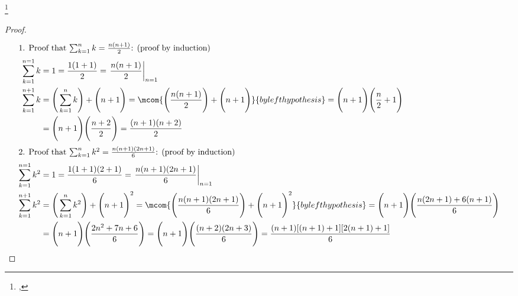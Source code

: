 \begin{proposition}
\footnote{
  ,
  }
\label{prop:powersums}
\end{proposition}
\begin{proof}
\begin{align*}
\intertext{1. Proof that $\sum_{k=1}^n k=\frac{n(n+1)}{2}$: (proof by induction)}
  \sum_{k=1}^{n=1} k
    &= 1
     = \frac{1(1+1)}{2}
     = \left.\frac{n(n+1)}{2}\right|_{n=1}
  \\
  \sum_{k=1}^{n+1} k
    &= \Bigg(\sum_{k=1}^n k\Bigg) + \Bigg(n+1\Bigg)
     = \mcom{\Bigg(\frac{n(n+1)}{2}\Bigg) + \Bigg(n+1\Bigg)}
       {by left hypothesis}
     = \Bigg(n+1\Bigg)\Bigg(\frac{n}{2}+1\Bigg)
  \\&= \Bigg(n+1\Bigg)\Bigg(\frac{n+2}{2}\Bigg)
     = \frac{(n+1)(n+2)}{2}
  \\
\intertext{2. Proof that $\sum_{k=1}^n k^2 = \frac{n(n+1)(2n+1)}{6}$: (proof by induction)}
  \sum_{k=1}^{n=1} k^2
    &= 1
     = \frac{1(1+1)(2+1)}{6}
     = \left.\frac{n(n+1)(2n+1)}{6}\right|_{n=1}
  \\
  \sum_{k=1}^{n+1} k^2
    &= \Bigg(\sum_{k=1}^n k^2\Bigg) + \Bigg(n+1\Bigg)^2
     = \mcom{\Bigg(\frac{n(n+1)(2n+1)}{6}\Bigg) + \Bigg(n+1\Bigg)^2}
            {by left hypothesis}
     = \Bigg(n+1\Bigg)\Bigg(\frac{n(2n+1)+6(n+1)}{6}\Bigg)
  \\&= \Bigg(n+1\Bigg)\Bigg(\frac{2n^2+7n+6}{6}\Bigg)
     = \Bigg(n+1\Bigg)\Bigg(\frac{(n+2)(2n+3)}{6}\Bigg)
     = \frac{(n+1)[(n+1)+1][2(n+1)+1]}{6}
\end{align*}
\end{proof}


